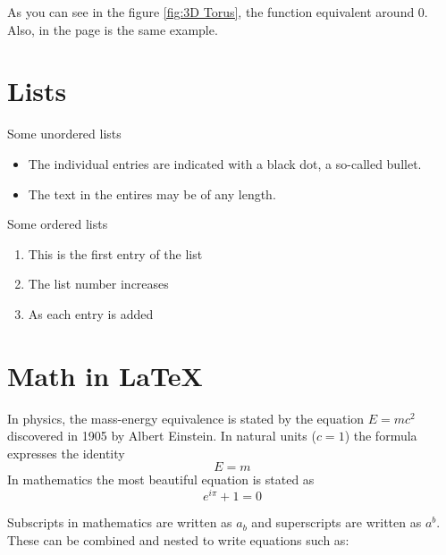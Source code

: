 \documentclass[12pt, a4paper]{report}
\begin{document}
As you can see in the figure \ref{fig:3D Torus}, the function equivalent around 0. Also, in the page \pageref{fig:3D Torus}
is the same example.

\section{Lists}

Some unordered lists
\begin{itemize}
    \item The individual entries are indicated with a black dot, a so-called bullet.
    \item The text in the entires may be of any length.
\end{itemize}

Some ordered lists
\begin{enumerate}
    \item This is the first entry of the list
    \item The list number increases
    \item As each entry is added
\end{enumerate}

\section{Math in \LaTeX{}}

In physics, the mass-energy equivalence is stated by the equation $E = mc^2$ discovered in 1905 by Albert Einstein. %
In natural units ($c = 1$) the formula expresses the identity
\[ E = m \] %
In mathematics the most beautiful equation is stated as
\begin{equation}
    e^{i\pi} + 1 = 0
\end{equation}



Subscripts in mathematics are written as $a_b$ and superscripts are written as $a^b$. These can be combined and nested to write equations such as:
\end{document}
